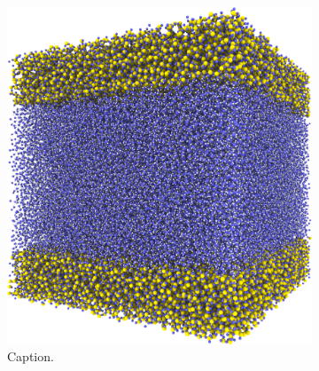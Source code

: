 %
\begin{figure}[htpb]%
    \centering%
    \setlength{\myfigwidth}{0.49\textwidth}%
%
    \begin{subfigure}[b]{\myfigwidth}%
        \centering%
        \includegraphics[width=\textwidth]{images/systems/trimmed-flat_square_fracture02_03}%
        \caption{Caption.}%
    \end{subfigure}%
    \hfill%
    \begin{subfigure}[b]{\myfigwidth}%
        \centering%

\end{subfigure}
\end{figure}
